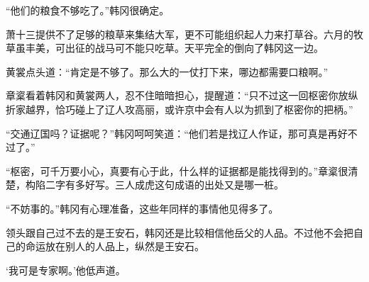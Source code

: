 “他们的粮食不够吃了。”韩冈很确定。

萧十三提供不了足够的粮草来集结大军，更不可能组织起人力来打草谷。六月的牧草虽丰美，可出征的战马可不能只吃草。天平完全的倒向了韩冈这一边。

黄裳点头道：“肯定是不够了。那么大的一仗打下来，哪边都需要口粮啊。”

章楶看着韩冈和黄裳两人，忍不住暗暗担心，提醒道：“只不过这一回枢密你放纵折家越界，恰巧碰上了辽人攻高丽，或许京中会有人以为抓到了枢密你的把柄。”

“交通辽国吗？证据呢？”韩冈呵呵笑道：“他们若是找辽人作证，那可真是再好不过了。”

“枢密，可千万要小心，真要有心于此，什么样的证据都是能找得到的。”章楶很清楚，构陷二字有多好写。三人成虎这句成语的出处又是哪一桩。

“不妨事的。”韩冈有心理准备，这些年同样的事情他见得多了。

领头跟自己过不去的是王安石，韩冈还是比较相信他岳父的人品。不过他不会把自己的命运放在别人的人品上，纵然是王安石。

‘我可是专家啊。’他低声道。
